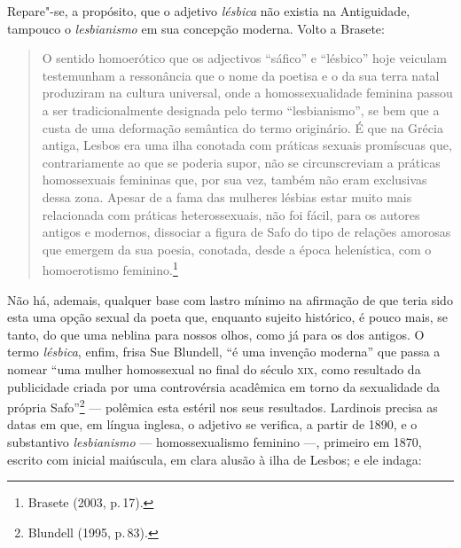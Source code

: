 
Repare"-se, a propósito, que o adjetivo \emph{lésbica} não existia na
Antiguidade, tampouco o \emph{lesbianismo} em sua concepção moderna.
Volto a Brasete:

\begin{quote}
O sentido homoerótico que os adjectivos ``sáfico'' e ``lésbico'' hoje veiculam testemunham a ressonância que o nome da poetisa e o da sua terra natal produziram na cultura universal, onde a homossexualidade feminina passou a ser tradicionalmente designada pelo termo ``lesbianismo'', se bem que a custa de uma deformação semântica do termo originário. É que na Grécia antiga, Lesbos era uma ilha conotada com práticas sexuais promíscuas que, contrariamente ao que se poderia supor, não se circunscreviam a práticas homossexuais femininas que, por sua vez, também não eram exclusivas dessa zona. Apesar de a fama das mulheres lésbias estar muito mais relacionada com práticas heterossexuais, não foi fácil, para os autores antigos e modernos, dissociar a figura de Safo do tipo de relações amorosas que emergem da sua poesia, conotada, desde a época helenística, com o homoerotismo feminino.\footnote{Brasete (2003, p.\,17).}
\end{quote}

\noindent{}Não há,
ademais, qualquer base com lastro mínimo na afirmação de que teria sido esta
uma opção sexual da poeta que, enquanto sujeito histórico, é pouco mais, se
tanto, do que uma neblina para nossos olhos, como já para os dos antigos. O
termo \emph{lésbica}, enfim, frisa Sue Blundell, “é uma
invenção moderna” que passa a nomear “uma mulher homossexual no final do século
\textsc{xix}, como resultado da publicidade criada por uma controvérsia acadêmica em
torno da sexualidade da própria Safo”\footnote{ Blundell (1995, p.\,83).} --- polêmica esta 
estéril nos seus resultados.
Lardinois precisa as datas em que, em
língua inglesa, o adjetivo se verifica, a partir de 1890, e o substantivo
\emph{lesbianismo} --- homossexualismo feminino ---, primeiro em 1870, escrito com
inicial maiúscula, em clara alusão à ilha de Lesbos; e ele indaga:

